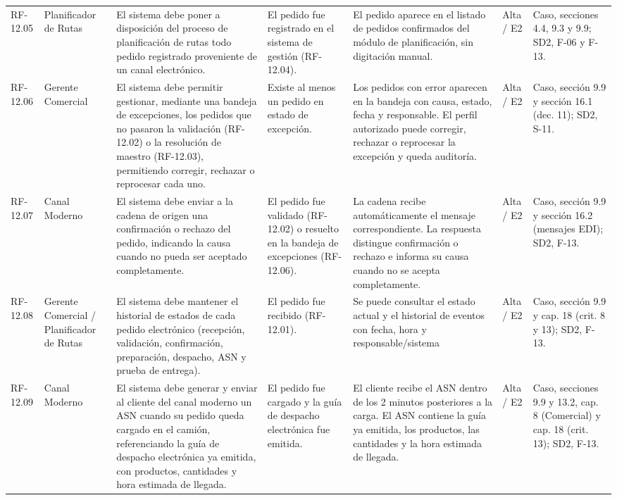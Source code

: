 {\begin{longtable}{@{}F{0.062} F{0.080} F{0.195} F{0.160} F{0.240} F{0.093} F{0.170}@{}}
  RF-12.05 & Planificador de Rutas & El sistema debe poner a disposición del proceso de planificación de rutas todo pedido registrado proveniente de un canal electrónico. & El pedido fue registrado en el sistema de gestión (RF-12.04). & El pedido aparece en el listado de pedidos confirmados del módulo de planificación, sin digitación manual. & Alta / E2 & Caso, secciones 4.4, 9.3 y 9.9; SD2, F-06 y F-13. \\
  RF-12.06 & Gerente Comercial & El sistema debe permitir gestionar, mediante una bandeja de excepciones, los pedidos que no pasaron la validación (RF-12.02) o la resolución de maestro (RF-12.03), permitiendo corregir, rechazar o reprocesar cada uno. & Existe al menos un pedido en estado de excepción. & Los pedidos con error aparecen en la bandeja con causa, estado, fecha y responsable. El perfil autorizado puede corregir, rechazar o reprocesar la excepción y queda auditoría. & Alta / E2 & Caso, sección 9.9 y sección 16.1 (dec. 11); SD2, S-11. \\
  RF-12.07 & Canal Moderno & El sistema debe enviar a la cadena de origen una confirmación o rechazo del pedido, indicando la causa cuando no pueda ser aceptado completamente. & El pedido fue validado (RF-12.02) o resuelto en la bandeja de excepciones (RF-12.06). & La cadena recibe automáticamente el mensaje correspondiente. La respuesta distingue confirmación o rechazo e informa su causa cuando no se acepta completamente. & Alta / E2 & Caso, sección 9.9 y sección 16.2 (mensajes EDI); SD2, F-13. \\
  RF-12.08 & Gerente Comercial / Planificador de Rutas & El sistema debe mantener el historial de estados de cada pedido electrónico (recepción, validación, confirmación, preparación, despacho, ASN y prueba de entrega). & El pedido fue recibido (RF-12.01). & Se puede consultar el estado actual y el historial de eventos con fecha, hora y responsable/sistema & Alta / E2 & Caso, sección 9.9 y cap. 18 (crit. 8 y 13); SD2, F-13. \\
  RF-12.09 & Canal Moderno & El sistema debe generar y enviar al cliente del canal moderno un ASN cuando su pedido queda cargado en el camión, referenciando la guía de despacho electrónica ya emitida, con productos, cantidades y hora estimada de llegada. & El pedido fue cargado y la guía de despacho electrónica fue emitida. & El cliente recibe el ASN dentro de los 2 minutos posteriores a la carga. El ASN contiene la guía ya emitida, los productos, las cantidades y la hora estimada de llegada. & Alta / E2 & Caso, secciones 9.9 y 13.2, cap. 8 (Comercial) y cap. 18 (crit. 13); SD2, F-13. \\

\end{longtable}}
